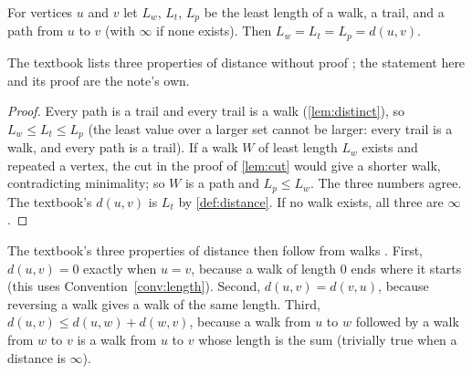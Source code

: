 \begin{proposition}[Distance]\label{prop:distance}
For vertices $u$ and $v$ let $L_w$, $L_t$, $L_p$ be the least length of a
walk, a trail, and a path from $u$ to $v$ (with $\infty$ if none exists).
Then $L_w=L_t=L_p=d(u,v)$.
\end{proposition}
The textbook lists three properties of distance without proof
\cite[p.~23]{petrosyan2015graphs}; the statement here and its proof are the
note's own.
\begin{proof}
Every path is a trail and every trail is a walk (\cref{lem:distinct}), so
$L_w\le L_t\le L_p$ (the least value over a larger set cannot be larger:
every trail is a walk, and every path is a trail). If a walk $W$ of least length $L_w$ exists and
repeated a vertex, the cut in the proof of \cref{lem:cut} would give a
shorter walk, contradicting minimality; so $W$ is a path and
$L_p\le L_w$. The three numbers agree. The textbook's $d(u,v)$ is $L_t$ by
\cref{def:distance}. If no walk exists, all three are $\infty$.
\end{proof}

\begin{remark}
The textbook's three properties of distance then follow from walks
\cite[p.~23]{petrosyan2015graphs}. First, $d(u,v)=0$ exactly when $u=v$,
because a walk of length $0$ ends where it starts (this uses
Convention~\ref{conv:length}). Second, $d(u,v)=d(v,u)$, because reversing a
walk gives a walk of the same length. Third,
$d(u,v)\le d(u,w)+d(w,v)$, because a walk from $u$ to $w$ followed by a
walk from $w$ to $v$ is a walk from $u$ to $v$ whose length is the sum
(trivially true when a distance is $\infty$).
\end{remark}
